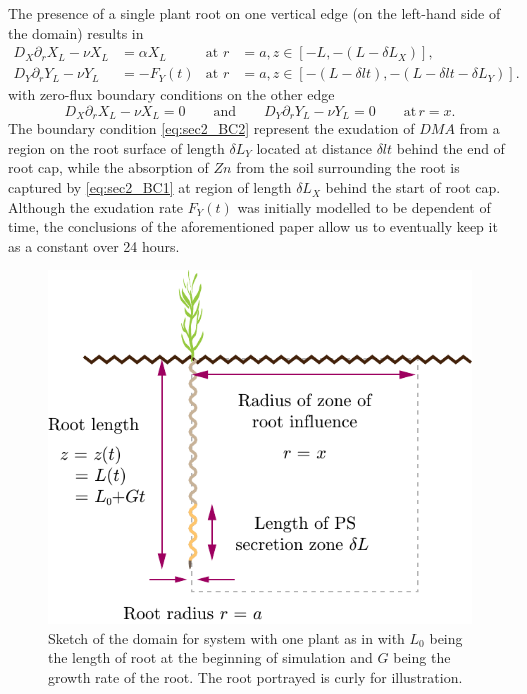\documentclass[11pt]{article}
\numberwithin{equation}{section}
\begin{document}
The presence of a single plant root on one vertical edge (on the left-hand side of the domain) results in 
\begin{align}
    D_X \partial_r X_L - \nu X_L &= \alpha X_L & \text{at } r &= a, z \in [-L, -(L - \delta L_X)], \label{eq:sec2_BC1} \\
    D_Y \partial_r Y_L - \nu Y_L &= -F_Y(t) &\text{at } r &= a, z \in [-(L - \delta lt), -(L - \delta lt - \delta L_Y)].
    \label{eq:sec2_BC2}
\end{align}
with zero-flux boundary conditions on the other edge
\begin{equation}
     D_X \partial_r X_L - \nu X_L = 0
    \qquad\text{and}\qquad
    D_Y \partial_r Y_L - \nu Y_L = 0 \qquad\text{at}\, r = x.
\end{equation}
The boundary condition \eqref{eq:sec2_BC2} represent the exudation of $DMA$ from a region on the root surface of length $\delta L_Y$ located at distance $\delta lt$ behind the end of root cap, while the absorption of $Zn$ from the soil surrounding the root is captured by \eqref{eq:sec2_BC1} at region of length $\delta L_X$ behind the start of root cap. Although the exudation rate $F_Y(t)$ was initially modelled to be dependent of time, the conclusions of the aforementioned paper allow us to eventually keep it as a constant over 24 hours.
\begin{figure}[!h]
    \centering
    \includegraphics[scale=0.7]{Figures/First-plot.pdf}
    \caption{Sketch of the domain for system with one plant as in \cite{Ptashnyk-2011} with $L_0$ being the length of root at the beginning of simulation and $G$ being the growth rate of the root. The root portrayed is curly for illustration.}
    \label{fig:geom}
\end{figure}
\newpage
\end{document}
